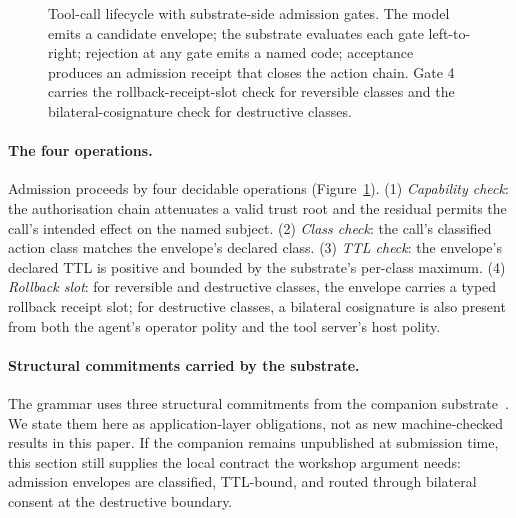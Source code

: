 \begin{figure}[t]
{%
}
\caption{Tool-call lifecycle with substrate-side admission gates. The model emits a candidate envelope; the substrate evaluates each gate left-to-right; rejection at any gate emits a named code; acceptance produces an admission receipt that closes the action chain. Gate 4 carries the rollback-receipt-slot check for reversible classes and the bilateral-cosignature check for destructive classes.}
\label{fig:tool-call-lifecycle}
\end{figure}

\paragraph{The four operations.}
Admission proceeds by four decidable operations (Figure~\ref{fig:tool-call-lifecycle}). (1) \emph{Capability check}: the authorisation chain attenuates a valid trust root and the residual permits the call's intended effect on the named subject. (2) \emph{Class check}: the call's classified action class matches the envelope's declared class. (3) \emph{TTL check}: the envelope's declared TTL is positive and bounded by the substrate's per-class maximum. (4) \emph{Rollback slot}: for reversible and destructive classes, the envelope carries a typed rollback receipt slot; for destructive classes, a bilateral cosignature is also present from both the agent's operator polity and the tool server's host polity.

\paragraph{Structural commitments carried by the substrate.}
The grammar uses three structural commitments from the companion substrate~\cite{programmableSovereignty2026}. We state them here as application-layer obligations, not as new machine-checked results in this paper. If the companion remains unpublished at submission time, this section still supplies the local contract the workshop argument needs: admission envelopes are classified, TTL-bound, and routed through bilateral consent at the destructive boundary.

